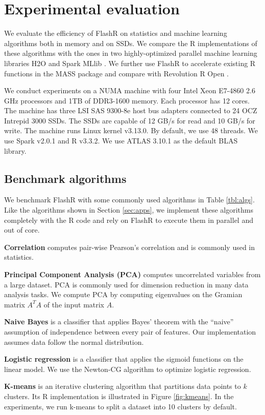\section{Experimental evaluation}
We evaluate the efficiency of FlashR on statistics and machine learning
algorithms both in memory and on SSDs. We compare the R implementations of
these algorithms with the ones in two highly-optimized parallel machine learning
libraries H2O \cite{h2o} and Spark MLlib \cite{mllib}. We further use FlashR
to accelerate existing R functions in the MASS package and compare with
Revolution R Open \cite{rro}.

We conduct experiments on a NUMA machine with
four Intel Xeon E7-4860 2.6 GHz processors and 1TB of 
DDR3-1600 memory. Each processor has 12 cores. The machine has three LSI SAS 9300-8e
host bus adapters connected to
24 OCZ Intrepid 3000 SSDs. The SSDs are capable of
12 GB/s for read and 10 GB/s for write. The machine runs
Linux kernel v3.13.0. By default, we use 48 threads. 
We use Spark v2.0.1 and R v3.3.2. We use ATLAS 3.10.1 as the default BLAS library.

\subsection{Benchmark algorithms}
We benchmark FlashR with some commonly used algorithms in Table
\ref{tbl:algs}. Like the algorithms shown in Section \ref{sec:apps},
we implement these algorithms completely with the R code and
rely on FlashR to execute them in parallel and out of core.

\noindent \textbf{Correlation} computes pair-wise Pearson's correlation
\cite{cor} and is commonly used in statistics.

\noindent \textbf{Principal Component Analysis (PCA)} computes uncorrelated
variables from a large dataset. PCA is commonly used for dimension reduction
in many data analysis tasks. We compute PCA by computing eigenvalues on the Gramian
matrix $A^T A$ of the input matrix $A$.

\noindent \textbf{Naive Bayes} is a classifier that applies Bayes' theorem
with the ``naive'' assumption of independence between every pair of features.
Our implementation assumes data follow the normal distribution.

\noindent \textbf{Logistic regression} is a classifier that applies
the sigmoid functions on the linear model. We use the Newton-CG algorithm
to optimize logistic regression.

\noindent \textbf{K-means} is an iterative clustering algorithm that
partitions data points to $k$ clusters. Its R implementation is illustrated
in Figure \ref{fig:kmeans}. In the experiments, we run k-means to split
a dataset into 10 clusters by default.

